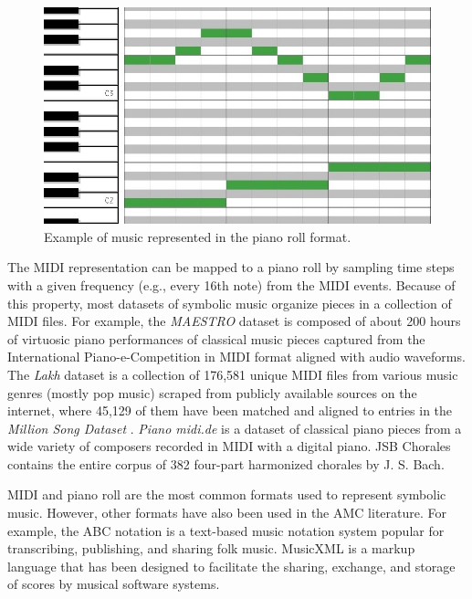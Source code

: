 \begin{figure}[!h]
 \centering
 \includegraphics[width=\columnwidth]{imgs/background/piano_roll.jpg}
 \caption{Example of music represented in the piano roll format.}
 \label{fig:piano_roll}
\end{figure}


The MIDI representation can be mapped to a piano roll by sampling time steps with a given frequency (e.g., every 16th note) from the MIDI events. Because of this property, most datasets of symbolic music organize pieces in a collection of MIDI files. For example, the \textit{MAESTRO} dataset \cite{hawthorne2018enabling} is composed of about 200 hours of virtuosic piano performances of classical music pieces captured from the International Piano-e-Competition \cite{yamahaEPiano} in MIDI format aligned with audio waveforms. The \textit{Lakh} \cite{raffel2016learning} dataset is a collection of 176,581 unique MIDI files from various music genres (mostly pop music) scraped from publicly available sources on the internet, where 45,129 of them have been matched and aligned to entries in the \textit{Million Song Dataset} \cite{bertin2011million}. \textit{Piano midi.de} is a dataset of classical piano pieces from a wide variety of composers recorded in MIDI with a digital piano. JSB Chorales \cite{boulanger2012modeling} contains the entire corpus of 382 four-part harmonized chorales by J. S. Bach.

MIDI and piano roll are the most common formats used to represent symbolic music. However, other formats have also been used in the AMC literature. For example, the ABC notation \cite{walshaw1993abc2mtex} is a text-based music notation system popular for transcribing, publishing, and sharing folk music. MusicXML \cite{good2001musicxml} is a markup language that has been designed to facilitate the sharing, exchange, and storage of scores by musical software systems.

